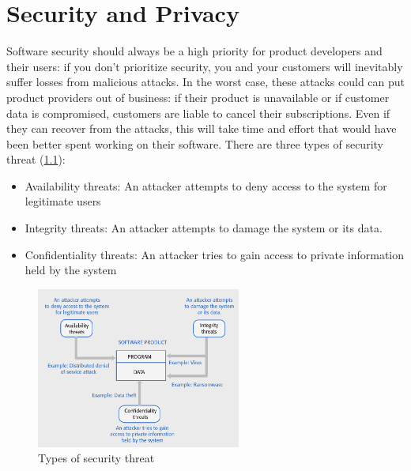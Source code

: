 \documentclass[10pt,a4paper]{report}
\begin{document}
\chapter{Security and Privacy}
 Software security should always be a high priority for product developers
and their users: if you don’t prioritize security, you and your customers will inevitably suffer losses from malicious attacks. In the worst case, these attacks could can put product providers out of business:  if their product is unavailable or if customer data is compromised, customers are liable to cancel their subscriptions. Even if they can recover from the attacks, this will take time and effort that would have been better spent working on their software.
There are three types of security threat (\ref{image83}):
\begin{itemize}
	\item Availability threats: An attacker attempts to deny access to the system for legitimate users
	\item Integrity threats: An attacker attempts to damage the system or its data.
	\item Confidentiality threats: An attacker tries to gain access to private information held by the system
\end{itemize}
\begin{figure}[h]
	\centering
	\includegraphics[width=0.6\textwidth]{image83}
	\caption{Types of security threat}
	\label{image83}
\end{figure} 
\end{document}
